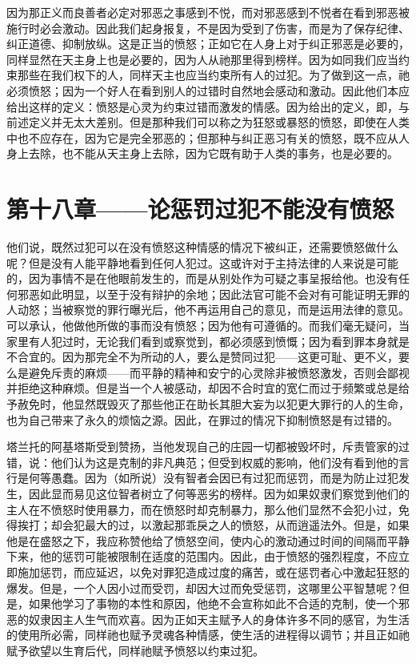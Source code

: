 因为那正义而良善者必定对邪恶之事感到不悦，而对邪恶感到不悦者在看到邪恶被施行时必会激动。因此我们起身报复，不是因为受到了伤害，而是为了保存纪律、纠正道德、抑制放纵。这是正当的愤怒；正如它在人身上对于纠正邪恶是必要的，同样显然在天主身上也是必要的，因为人从祂那里得到榜样。因为如同我们应当约束那些在我们权下的人，同样天主也应当约束所有人的过犯。为了做到这一点，祂必须愤怒；因为一个好人在看到别人的过错时自然地会感动和激动。因此他们本应给出这样的定义：愤怒是心灵为约束过错而激发的情感。因为给出的定义，即，与前述定义并无太大差别。但是那种我们可以称之为狂怒或暴怒的愤怒，即使在人类中也不应存在，因为它是完全邪恶的；但那种与纠正恶习有关的愤怒，既不应从人身上去除，也不能从天主身上去除，因为它既有助于人类的事务，也是必要的。\par


\section{第十八章——论惩罚过犯不能没有愤怒}

他们说，既然过犯可以在没有愤怒这种情感的情况下被纠正，还需要愤怒做什么呢？但是没有人能平静地看到任何人犯过。这或许对于主持法律的人来说是可能的，因为事情不是在他眼前发生的，而是从别处作为可疑之事呈报给他。也没有任何邪恶如此明显，以至于没有辩护的余地；因此法官可能不会对有可能证明无罪的人动怒；当被察觉的罪行曝光后，他不再运用自己的意见，而是运用法律的意见。可以承认，他做他所做的事而没有愤怒；因为他有可遵循的。而我们毫无疑问，当家里有人犯过时，无论我们看到或察觉到，都必须感到愤慨；因为看到罪本身就是不合宜的。因为那完全不为所动的人，要么是赞同过犯——这更可耻、更不义，要么是避免斥责的麻烦——而平静的精神和安宁的心灵除非被愤怒激发，否则会鄙视并拒绝这种麻烦。但是当一个人被感动，却因不合时宜的宽仁而过于频繁或总是给予赦免时，他显然既毁灭了那些他正在助长其胆大妄为以犯更大罪行的人的生命，也为自己带来了永久的烦恼之源。因此，在罪过的情况下抑制愤怒是有过错的。\par

塔兰托的阿基塔斯受到赞扬，当他发现自己的庄园一切都被毁坏时，斥责管家的过错，说：他们认为这是克制的非凡典范；但受到权威的影响，他们没有看到他的言行是何等愚蠢。因为（如所说）没有智者会因已有过犯而惩罚，而是为防止过犯发生，因此显而易见这位智者树立了何等恶劣的榜样。因为如果奴隶们察觉到他们的主人在不愤怒时使用暴力，而在愤怒时却克制暴力，那么他们显然不会犯小过，免得挨打；却会犯最大的过，以激起那乖戾之人的愤怒，从而逍遥法外。但是，如果他是在盛怒之下，我应称赞他给了愤怒空间，使内心的激动通过时间的间隔而平静下来，他的惩罚可能被限制在适度的范围内。因此，由于愤怒的强烈程度，不应立即施加惩罚，而应延迟，以免对罪犯造成过度的痛苦，或在惩罚者心中激起狂怒的爆发。但是，一个人因小过而受罚，却因大过而免受惩罚，这哪里公平智慧呢？但是，如果他学习了事物的本性和原因，他绝不会宣称如此不合适的克制，使一个邪恶的奴隶因主人生气而欢喜。因为正如天主赋予人的身体许多不同的感官，为生活的使用所必需，同样祂也赋予灵魂各种情感，使生活的进程得以调节；并且正如祂赋予欲望以生育后代，同样祂赋予愤怒以约束过犯。\par

